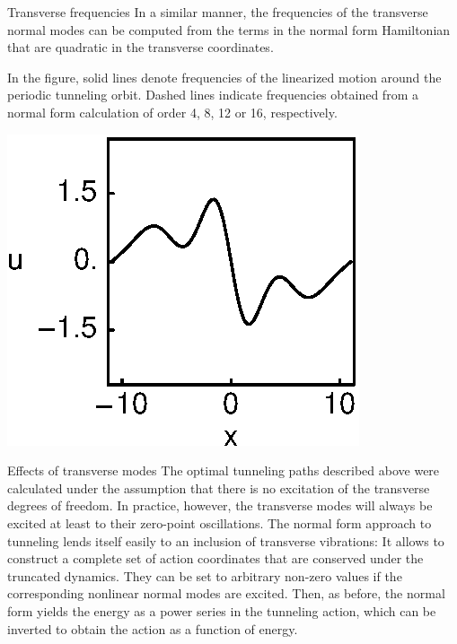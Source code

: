 \documentclass{theo1poster}[2003/04/25]
\begin{document}
\begin{poster}{3}
\begin{sheet}{Transverse frequencies}
In a similar manner, the frequencies of the transverse normal modes can be
computed from the terms in the normal form Hamiltonian that are quadratic
in the transverse coordinates.

In the figure, solid lines denote frequencies of the linearized motion
around the periodic tunneling orbit. Dashed lines indicate frequencies
obtained from a normal form calculation of order 4, 8, 12 or 16, respectively.

\centerline{\includegraphics[width=.96\textwidth]{../../figs/1wKS22equil.eps}}
\end{sheet}



\begin{sheet}{Effects of transverse modes}
The optimal tunneling paths described above were calculated under the
assumption that there is no excitation of the transverse degrees of
freedom. In practice, however, the transverse modes will always be excited
at least to their zero-point oscillations. The normal form approach to
tunneling lends itself easily to an inclusion of transverse vibrations: It
allows to construct a complete set of action coordinates that are conserved
under the truncated dynamics. They can be set to arbitrary non-zero values
if the corresponding nonlinear normal modes are excited. Then, as before,
the normal form yields the energy as a power series in the tunneling
action, which can be inverted to obtain the action as a function of energy.


\end{sheet}
\end{poster}
\end{document}
